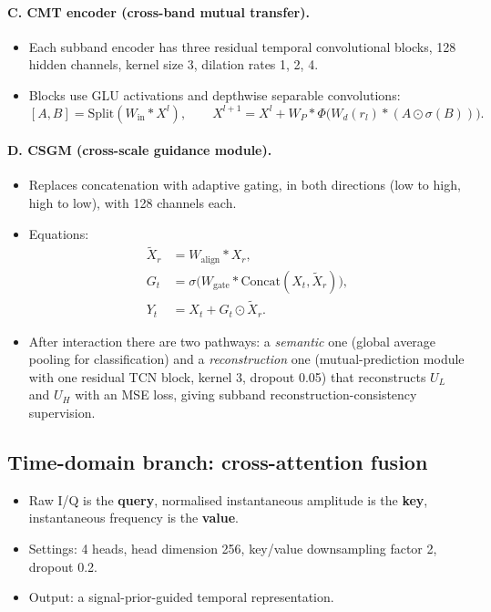 \documentclass[11pt,a4paper]{article}
\begin{document}
\paragraph{C. CMT encoder (cross-band mutual transfer).}
\begin{itemize}
  \item Each subband encoder has three residual temporal convolutional blocks, 128 hidden channels, kernel size 3, dilation rates 1, 2, 4.
  \item Blocks use GLU activations and depthwise separable convolutions:
  \[ [A,B] = \text{Split}(W_{\text{in}} * X^l), \qquad X^{l+1} = X^l + W_P * \Phi\big(W_d(r_l) * (A \odot \sigma(B))\big). \]
\end{itemize}

\paragraph{D. CSGM (cross-scale guidance module).}
\begin{itemize}
  \item Replaces concatenation with adaptive gating, in both directions (low to high, high to low), with 128 channels each.
  \item Equations:
  \begin{align*}
    \tilde{X}_r &= W_{\text{align}} * X_r,\\
    G_t &= \sigma\big(W_{\text{gate}} * \text{Concat}(X_t, \tilde{X}_r)\big),\\
    Y_t &= X_t + G_t \odot \tilde{X}_r.
  \end{align*}
  \item After interaction there are two pathways: a \emph{semantic} one (global average pooling for classification) and a \emph{reconstruction} one (mutual-prediction module with one residual TCN block, kernel 3, dropout 0.05) that reconstructs $U_L$ and $U_H$ with an MSE loss, giving subband reconstruction-consistency supervision.
\end{itemize}

\subsection{Time-domain branch: cross-attention fusion}

\begin{itemize}
  \item Raw I/Q is the \textbf{query}, normalised instantaneous amplitude is the \textbf{key}, instantaneous frequency is the \textbf{value}.
  \item Settings: 4 heads, head dimension 256, key/value downsampling factor 2, dropout 0.2.
  \item Output: a signal-prior-guided temporal representation.
\end{itemize}
\end{document}
